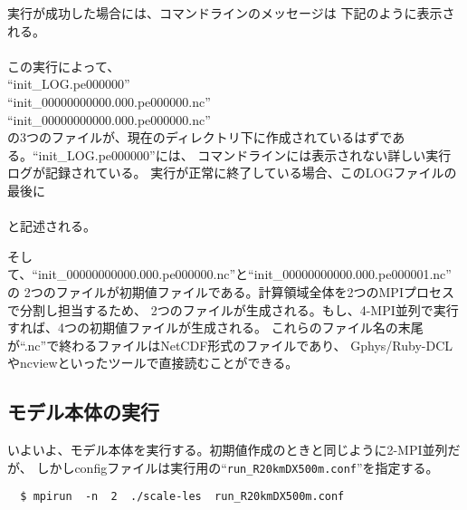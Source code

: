 \noindent 実行が成功した場合には、コマンドラインのメッセージは
下記のように表示される。\\

\\

\noindent この実行によって、\\
``init\_LOG.pe000000''\\
``init\_00000000000.000.pe000000.nc''\\
``init\_00000000000.000.pe000000.nc''\\
の3つのファイルが、現在のディレクトリ下に作成されているはずである。``init\_LOG.pe000000''には、
コマンドラインには表示されない詳しい実行ログが記録されている。
実行が正常に終了している場合、このLOGファイルの最後に\\

\\

\noindent と記述される。

そして、``init\_00000000000.000.pe000000.nc''と``init\_00000000000.000.pe000001.nc''の
2つのファイルが初期値ファイルである。計算領域全体を2つのMPIプロセスで分割し担当するため、
2つのファイルが生成される。もし、4-MPI並列で実行すれば、4つの初期値ファイルが生成される。
これらのファイル名の末尾が``.nc''で終わるファイルはNetCDF形式のファイルであり、
Gphys/Ruby-DCLやncviewといったツールで直接読むことができる。


\subsection{モデル本体の実行}
いよいよ、モデル本体を実行する。初期値作成のときと同じように2-MPI並列だが、
しかしconfigファイルは実行用の``\verb|run_R20kmDX500m.conf|''を指定する。
\begin{verbatim}
  $ mpirun  -n  2  ./scale-les  run_R20kmDX500m.conf
\end{verbatim}

